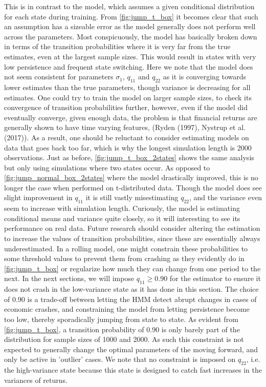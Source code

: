 This is in contrast to the \mle model, which assumes a given conditional distribution for each state during training. From \cref{fig:jump_t_box} it becomes clear that such an assumption has a sizeable error as the model generally does not perform well across the parameters. Most conspicuously, the \mle model has basically broken down in terms of the transition probabilities where it is very far from the true estimates, even at the largest sample sizes. This would result in states with very low persistence and frequent state switching. Here we note that the \mle model does not seem consistent for parameters $\sigma_1$, $q_{11}$ and $q_{22}$ as it is converging towards lower estimates than the true parameters, though variance is decreasing for all estimates. One could try to train the \mle model on larger sample sizes, to check its convergence of transition probabilities further, however, even if the model did eventually converge, given enough data, the problem is that financial returns are generally shown to have time varying features, (Ryden (1997), Nystrup et al. (2017)). As a result, one should be reluctant to consider estimating models on data that goes back too far, which is why the longest simulation length is 2000 observations. Just as before, \cref{fig:jump_t_box_2states} shows the same analysis but only using simulations where two states occur. As opposed to \cref{fig:jump_normal_box_2states} where the \mle model drastically improved, this is no longer the case when performed on t-distributed data. Though the \mle model does see slight improvement in $q_{11}$ it is still vastly misestimating $q_{22}$, and the variance even seem to increase with simulation length. Curiously, the \mle model is estimating conditional means and variance quite closely, so it will interesting to see its performance on real data. Future research should consider altering the \mle estimation to increase the values of transition probabilities, since these are essentially always underestimated. In a rolling model, one might constrain these probabilities to some threshold values to prevent them from crashing as they evidently do in \cref{fig:jump_t_box} or regularize how much they can change from one period to the next. In the next sections, we will impose $q_{11} \geq 0.90$ for the \mle estimator to ensure it does not crash in the low-variance state as it has done in this section. The choice of 0.90 is a trade-off between letting the HMM detect abrupt changes in cases of economic crashes, and constraining the model from letting persistence become too low, thereby sporadically jumping from state to state. As evident from \cref{fig:jump_t_box}, a transition probability of 0.90 is only barely part of the distribution for sample sizes of 1000 and 2000. As such this constraint is not expected to generally change the optimal parameters of the \mle moving forward, and only be active in 'outlier' cases. We note that no constraint is imposed on $q_{22}$, i.e. the high-variance state because this state is designed to catch fast increases in the variances of returns.

